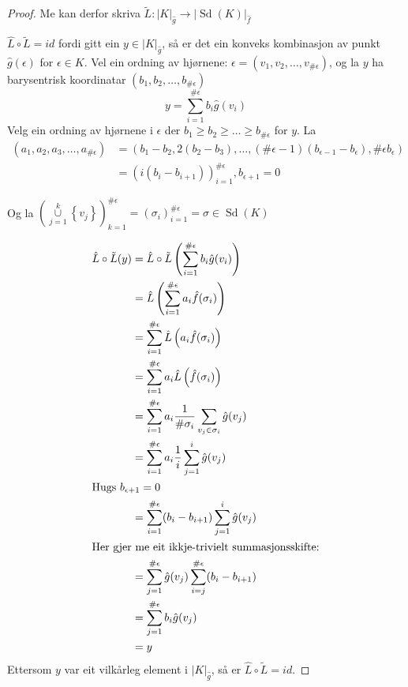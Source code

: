 \documentclass[a4paper, 12pt, norsk]{article}
\theoremstyle{plain}
\theoremstyle{definition}
\newcommand{\union}{ \mathop{\cup}\limits }
\newcommand{\gr}[1]{ \lvert #1 \rvert } %
\newcommand{\set}[1]{ \left \{ #1 \right \} } %
\newcommand{\tuple}[1]{ \left( #1 \right) } %
\DeclareMathOperator{\Sd}{Sd}
\begin{document}
\begin{proof}
	Me kan derfor skriva \( \tilde{L}: \gr{K}_{\hat{g}} \to \gr{\Sd(K)}_{\hat{f}} \)

	\( \hat{L}\circ\tilde{L} = id \) fordi gitt ein \( y \in \gr{K}_{\hat{g}} \), så er det ein konveks kombinasjon av punkt \( \hat{g}(\epsilon) \) for \( \epsilon \in K \). Vel ein ordning av hjørnene: \( \epsilon = (v_1, v_2, \dots, v_{\#\epsilon}) \), og la \( y \) ha barysentrisk koordinatar \( (b_1, b_2, \dots, b_{\#\epsilon}) \)
	\[
		y = \sum_{i = 1}^{\#\epsilon} b_i \hat{g}(v_i)
	\]
	Velg ein ordning av hjørnene i \( \epsilon \) der \( b_1 \geq b_2 \geq \dots \geq b_{\#\epsilon} \) for \( y \). La 
	\begin{align*}
		(a_1, a_2, a_3, \dots, a_{\#\epsilon}) &= \left( b_1-b_2, 2(b_2-b_3), \dots, (\#\epsilon-1)(b_{\epsilon-1}-b_{\epsilon}), \#\epsilon b_{\epsilon} \right) \\
		&= \left( i (b_i-b_{i+1}) \right)_{i=1}^{\#\epsilon}, b_{\epsilon+1} = 0
	\end{align*}
		
	Og la \( \left(\union_{j = 1}^{k} \set{v_j} \right)_{k=1}^{\#\epsilon} = (\sigma_i)_{i=1}^{\#\epsilon}=\sigma \in \Sd(K) \)
	
	\begin{align*} %
		\hat{L}\circ\tilde{L}(y) &= \hat{L}\circ\tilde{L}\tuple{\sum_{i=1}^{\#\epsilon} b_i \hat{g}(v_i)} \\
		&= \hat{L}\left( \sum_{i=1}^{\#\epsilon} a_i \hat{f}(\sigma_i) \right) \\
		&= \sum_{i=1}^{\#\epsilon} \hat{L} \left( a_i \hat{f}(\sigma_i) \right) \\
		&= \sum_{i=1}^{\#\epsilon} a_i \hat{L} \left( \hat{f}(\sigma_i) \right) \\
		&= \sum_{i=1}^{\#\epsilon} a_i \frac{1}{\#\sigma_i} \sum_{v_j \in \sigma_i} \hat{g}(v_j) \\
		&= \sum_{i=1}^{\#\epsilon} a_i \frac{1}{i} \sum_{j = 1}^{i} \hat{g}(v_j) \\
		\intertext{Hugs \( b_{\epsilon+1} = 0 \)}
		&= \sum_{i=1}^{\#\epsilon} (b_{i}-b_{i+1}) \sum_{j = 1}^{i} \hat{g}(v_j) \\
		\intertext{Her gjer me eit ikkje-trivielt summasjonsskifte:}
		&= \sum_{j=1}^{\#\epsilon} \hat{g}(v_j) \sum_{i = j}^{\#\epsilon} (b_{i}-b_{i+1}) \\
		&= \sum_{j=1}^{\#\epsilon} b_i \hat{g}(v_j) \\
		&= y
	\end{align*}
	Ettersom \( y \) var eit vilkårleg element i \( \gr{K}_{\hat{g}} \), så er \( \hat{L}\circ\tilde{L} = id \).


\end{proof}
\end{document}
